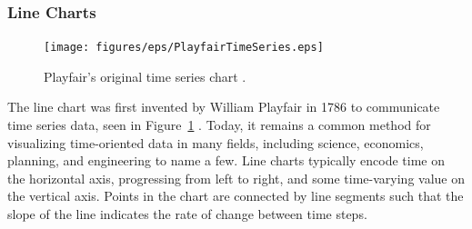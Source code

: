 
\subsubsection{Line Charts}

\begin{figure}[h]
	\centering
	\texttt{[image: figures/eps/PlayfairTimeSeries.eps]}
	\caption{Playfair's original time series chart \cite{playfair}.}
	\label{fig:playfair}
\end{figure}

The line chart was first invented by William Playfair in 1786 to communicate time series data, seen in Figure~\ref{fig:playfair} \cite{playfair}.  Today, it remains a common method for visualizing time-oriented data in many fields, including science, economics, planning, and engineering to name a few.  Line charts typically encode time on the horizontal axis, progressing from left to right, and some time-varying value on the vertical axis.  Points in the chart are connected by line segments such that the slope of the line indicates the rate of change between time steps.  


